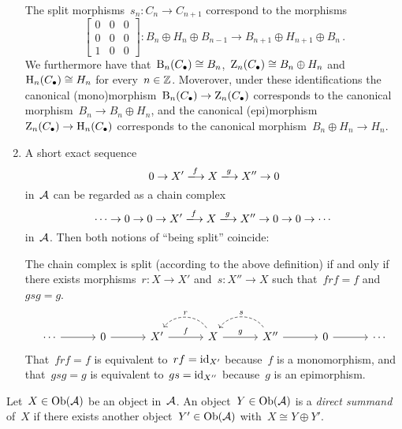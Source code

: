 \begin{remark*}
\begin{enumerate}
      The split morphisms~$s_n \colon C_n \to C_{n+1}$ correspond to the morphisms
      \[
        \begin{bmatrix}
          0 & 0 & 0 \\
          0 & 0 & 0 \\
          1 & 0 & 0
        \end{bmatrix}
        \colon
        B_n \oplus H_n \oplus B_{n-1}
        \to
        B_{n+1} \oplus H_{n+1} \oplus B_n \,.
      \]
      We furthermore have that~$\operatorname{B}_n(C_\bullet) \cong B_n$,~$\operatorname{Z}_n(C_\bullet) \cong B_n \oplus H_n$ and~$\operatorname{H}_n(C_\bullet) \cong H_n$ for every~$n \in \mathbb{Z}$.
      Moverover, under these identifications the canonical (mono)mor\-phism~$\operatorname{B}_n(C_\bullet) \to \operatorname{Z}_n(C_\bullet)$ corresponds to the canonical morphism~$B_n \to B_n \oplus H_n$, and the canonical (epi)morphism~$\operatorname{Z}_n(C_\bullet) \to \operatorname{H}_n(C_\bullet)$ corresponds to the canonical morphism~$B_n \oplus H_n \to H_n$.
    \item
      A short exact sequence
      \[
        0
        \to
        X'
        \xlongto{f}
        X
        \xlongto{g}
        X''
        \to
        0
      \]
      in~$\mathcal{A}$ can be regarded as a chain complex
      \[
        \dotsb
        \to
        0
        \to
        0
        \to
        X'
        \xlongto{f}
        X
        \xlongto{g}
        X''
        \to
        0
        \to
        0
        \to
        \dotsb
      \]
      in~$\mathcal{A}$.
      Then both notions of \enquote{being split} coincide:
      
      The chain complex is split (according to the above definition) if and only if there exists morphisms~$r \colon X \to X'$ and~$s \colon X'' \to X$ such that~$frf = f$ and~$gsg = g$.
      \[
        \begin{tikzcd}[column sep = 3.2em]
            \dotsb
            \arrow{r}
          & 0
            \arrow{r}
          & X'
            \arrow{r}[above]{f}
          & X
            \arrow[dashed, bend right=55]{l}[above]{r}
            \arrow{r}[above]{g}
          & X''
            \arrow[dashed, bend right=55]{l}[above]{s}
            \arrow{r}
          & 0
            \arrow{r}
          & \dotsb
        \end{tikzcd}
      \]
      That~$frf = f$ is equivalent to~$rf = \operatorname{id}_{X'}$ because~$f$ is a monomorphism, and that~$gsg = g$ is equivalent to~$gs = \operatorname{id}_{X''}$ because~$g$ is an epimorphism.
  \end{enumerate}
\end{remark*}


\begin{definition}
  Let~$X \in \operatorname{Ob}(\mathcal{A})$ be an object in~$\mathcal{A}$.
  An object~$Y \in \operatorname{Ob}(\mathcal{A})$ is a \emph{direct summand} of~$X$ if there exists another object~$Y' \in \operatorname{Ob}(\mathcal{A})$ with~$X \cong Y \oplus Y'$.
\end{definition}



